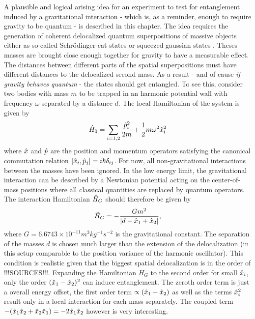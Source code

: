 A plausible and logical arising idea for an experiment to test for entanglement induced by a gravitational interaction - which is, as a reminder, enough to require gravity to be quantum - is described in this chapter.
The idea requires the generation of coherent delocalized quantum superpositions of massive objects either as so-called Schrödinger-cat states or squeezed gaussian states \cite{Pedernales_2023}. Theses masses are brought close enough together for gravity to have a measurable effect. The distances between different parts of the spatial superpositions must have different distances to the delocalized second mass. As a result - and of cause \textit{if gravity behaves quantum} - the states should get entangled.
To see this, consider two bodies with mass $m$ to be trapped in an harmonic potential wall with frequency $\omega$ separated by a distance $d$. The local Hamiltonian of the system is given by
\begin{equation}
  \hat{H}_0 = \sum_{i = 1,2} \frac{\hat{p}_i^2}{2m} + \frac{1}{2}m\omega^2\hat{x}^2_i
\end{equation}
where $\hat{x}$ and $\hat{p}$ are the position and momentum operators satisfying the canonical commutation relation $[\hat{x}_i, \hat{p}_j] = i\hbar \delta_{ij}$.
For now, all non-gravitational interactions between the masses have been ignored. In the low energy limit, the gravitational interaction can be described by a Newtonian potential acting on the center-of-mass positions where all classical quantities are replaced by quantum operators. The interaction Hamiltonian $\hat{H}_G$ should therefore be given by
\begin{equation}
  \hat{H}_G = - \frac{Gm^2}{\left\lvert d - \hat{x}_1 + \hat{x}_2\right\rvert} ,
\end{equation}
where $G=6.6743 \times 10^{-11} \si{m^3 kg^{-1} s^{-2}}$ is the gravitational constant. The separation of the masses $d$ is chosen much larger than the extension of the delocalization (in this setup comparable to the position variance of the harmonic oscillator). This condition is realistic given that the biggest spatial delocalization is in the order of !!!SOURCES!!!.
Expanding the Hamiltonian $H_G$ to the second order for small $\hat{x}_i$, only the order $(\hat{x}_1 - \hat{x}_2)^2$ can induce entanglement. The zeroth order term is just a overall energy offset, the first order term $\propto (\hat{x}_1 - \hat{x}_2)$ as well as the terms $\hat{x}^2_i$ result only in a local interaction for each mass separately. The coupled term $ - (\hat{x}_1\hat{x}_2 + \hat{x}_2\hat{x}_1) = -2\hat{x}_1\hat{x}_2$ however is very interesting.
